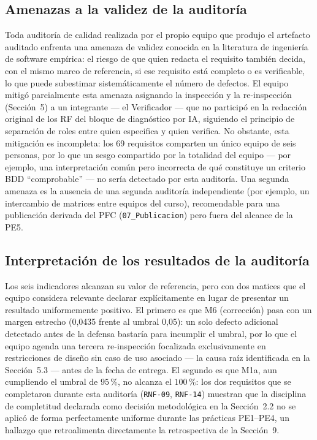 \documentclass[11pt,a4paper]{article}
\newcommand{\id}[1]{\texttt{#1}}
\begin{document}
\subsection{Amenazas a la validez de la auditoría}

Toda auditoría de calidad realizada por el propio equipo que produjo el artefacto auditado enfrenta
una amenaza de validez conocida en la literatura de ingeniería de software empírica: el riesgo de
que quien redacta el requisito también decida, con el mismo marco de referencia, si ese requisito
está completo o es verificable, lo que puede subestimar sistemáticamente el número de defectos. El
equipo mitigó parcialmente esta amenaza asignando la inspección y la re-inspección (Sección~5) a un
integrante --- el Verificador --- que no participó en la redacción original de los RF del bloque de
diagnóstico por IA, siguiendo el principio de separación de roles entre quien especifica y quien
verifica. No obstante, esta mitigación es incompleta: los 69 requisitos comparten un único equipo de
seis personas, por lo que un sesgo compartido por la totalidad del equipo --- por ejemplo, una
interpretación común pero incorrecta de qué constituye un criterio BDD ``comprobable'' --- no sería
detectado por esta auditoría. Una segunda amenaza es la ausencia de una segunda auditoría
independiente (por ejemplo, un intercambio de matrices entre equipos del curso), recomendable para
una publicación derivada del PFC (\id{07\_Publicacion}) pero fuera del alcance de la PE5.

\subsection{Interpretación de los resultados de la auditoría}

Los seis indicadores alcanzan su valor de referencia, pero con dos matices que el equipo considera
relevante declarar explícitamente en lugar de presentar un resultado uniformemente positivo. El
primero es que M6 (corrección) pasa con un margen estrecho (0,0435 frente al umbral 0,05): un solo
defecto adicional detectado antes de la defensa bastaría para incumplir el umbral, por lo que el
equipo agenda una tercera re-inspección focalizada exclusivamente en restricciones de diseño sin
caso de uso asociado --- la causa raíz identificada en la Sección~5.3 --- antes de la fecha de
entrega. El segundo es que M1a, aun cumpliendo el umbral de $95\,\%$, no alcanza el $100\,\%$: los
dos requisitos que se completaron durante esta auditoría (\id{RNF-09}, \id{RNF-14}) muestran que la
disciplina de completitud declarada como decisión metodológica en la Sección~2.2 no se aplicó de
forma perfectamente uniforme durante las prácticas PE1--PE4, un hallazgo que retroalimenta
directamente la retrospectiva de la Sección~9.
\end{document}
